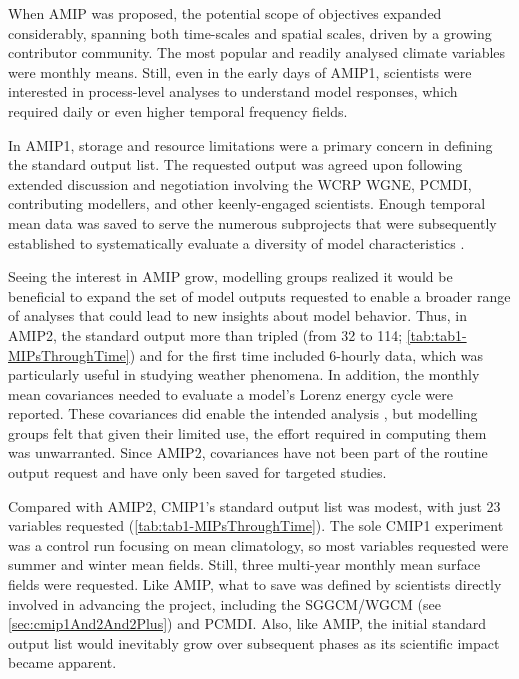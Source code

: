 \documentclass[gmd, preprint]{copernicus}
\begin{document}
When AMIP was proposed, the potential scope of objectives expanded considerably, spanning both time-scales and spatial scales, driven by a growing contributor community. The most popular and readily analysed climate variables were monthly means. Still, even in the early days of AMIP1, scientists were interested in process-level analyses to understand model responses, which required daily or even higher temporal frequency fields.

In AMIP1, storage and resource limitations were a primary concern in defining the standard output list. The requested output was agreed upon following extended discussion and negotiation involving the WCRP WGNE, PCMDI, contributing modellers, and other keenly-engaged scientists. Enough temporal mean data was saved to serve the numerous subprojects that were subsequently established to systematically evaluate a diversity of model characteristics \citep{gates_amip_1995}. 

Seeing the interest in AMIP grow, modelling groups realized it would be beneficial to expand the set of model outputs requested to enable a broader range of analyses that could lead to new insights about model behavior. Thus, in AMIP2, the standard output more than tripled (from 32 to 114; \autoref{tab:tab1-MIPsThroughTime}) and for the first time included 6-hourly data, which was particularly useful in studying weather phenomena. In addition, the monthly mean covariances needed to evaluate a model's Lorenz energy cycle were reported. These covariances did enable the intended analysis \citep{boer_energy_2008}, but modelling groups felt that given their limited use, the effort required in computing them was unwarranted. Since AMIP2, covariances have not been part of the routine output request and have only been saved for targeted studies.

Compared with AMIP2, CMIP1's standard output list was modest, with just 23 variables requested (\autoref{tab:tab1-MIPsThroughTime}). The sole CMIP1 experiment was a control run focusing on mean climatology, so most variables requested were summer and winter mean fields. Still, three multi-year monthly mean surface fields were requested. Like AMIP, what to save was defined by scientists directly involved in advancing the project, including the SGGCM/WGCM (see \autoref{sec:cmip1And2And2Plus}) and PCMDI. Also, like AMIP, the initial standard output list would inevitably grow over subsequent phases as its scientific impact became apparent.
\end{document}
